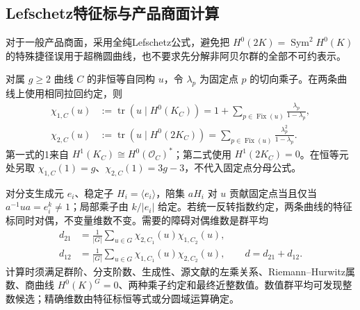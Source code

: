 \documentclass[UTF8,a4paper,11pt,fontset=fandol]{ctexart}
\numberwithin{equation}{section}
\theoremstyle{definition}
\newcommand{\tr}{\operatorname{tr}}
\begin{document}
\subsection{Lefschetz特征标与产品商面计算}
对于一般产品商面，采用全纯Lefschetz公式，避免把 $H^0(2K)=\operatorname{Sym}^2H^0(K)$ 的特殊捷径误用于超椭圆曲线，也不要求先分解非阿贝尔群的全部不可约表示。

对属 $g\ge2$ 曲线 $C$ 的非恒等自同构 $u$，令 $\lambda_p$ 为固定点 $p$ 的切向乘子。在两条曲线上使用相同拉回约定，则
\begin{align*}
\chi_{1,C}(u)&:=\tr(u\mid H^0(K_C))
=1+\sum_{p\in\operatorname{Fix}(u)}\frac{\lambda_p}{1-\lambda_p},\\
\chi_{2,C}(u)&:=\tr(u\mid H^0(2K_C))
=\sum_{p\in\operatorname{Fix}(u)}\frac{\lambda_p^2}{1-\lambda_p}.
\end{align*}
第一式的1来自 $H^1(K_C)\cong H^0(\mathcal O_C)^*$；第二式使用 $H^1(2K_C)=0$。在恒等元处另取 $\chi_{1,C}(1)=g$、$\chi_{2,C}(1)=3g-3$，不代入固定点分母公式。

对分支生成元 $e_i$、稳定子 $H_i=\langle e_i\rangle$，陪集 $aH_i$ 对 $u$ 贡献固定点当且仅当 $a^{-1}ua=e_i^k\ne1$；局部乘子由 $k/|e_i|$ 给定。若统一反转指数约定，两条曲线的特征标同时对偶，不变量维数不变。需要的障碍对偶维数是群平均
\begin{align*}
d_{21}&=\frac1{|G|}\sum_{u\in G}\chi_{2,C_1}(u)\chi_{1,C_2}(u),\\
d_{12}&=\frac1{|G|}\sum_{u\in G}\chi_{1,C_1}(u)\chi_{2,C_2}(u),\qquad
d=d_{21}+d_{12}.
\end{align*}
计算时须满足群阶、分支阶数、生成性、源文献的左乘关系、Riemann--Hurwitz属数、商曲线 $H^0(K)^G=0$、两种乘子约定和最终近整数值。数值群平均可发现整数候选；精确维数由特征标恒等式或分圆域运算确定。
\end{document}
